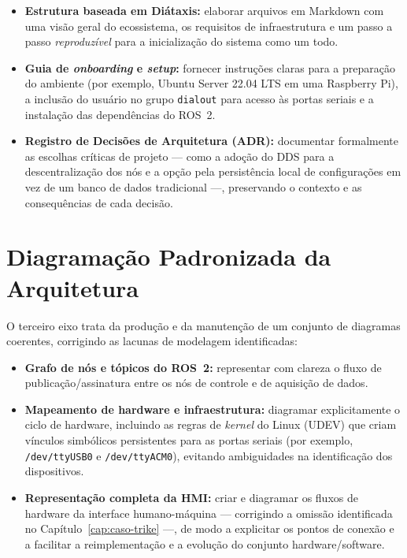 \begin{itemize}
	\item \textbf{Estrutura baseada em Diátaxis:} elaborar arquivos em Markdown com uma visão
	      geral do ecossistema, os requisitos de infraestrutura e um passo a passo
	      \emph{reproduzível} para a inicialização do sistema como um todo.
	\item \textbf{Guia de \emph{onboarding} e \emph{setup}:} fornecer instruções claras para a
	      preparação do ambiente (por exemplo, Ubuntu Server 22.04 LTS em uma Raspberry Pi), a
	      inclusão do usuário no grupo \texttt{dialout} para acesso às portas seriais e a
	      instalação das dependências do ROS~2.
	\item \textbf{Registro de Decisões de Arquitetura (ADR):} documentar formalmente as
	      escolhas críticas de projeto --- como a adoção do DDS para a descentralização dos
	      nós e a opção pela persistência local de configurações em vez de um banco de dados
	      tradicional ---, preservando o contexto e as consequências de cada decisão.
\end{itemize}

\section{Diagramação Padronizada da Arquitetura}
\label{sec:prop-diagramas}

O terceiro eixo trata da produção e da manutenção de um conjunto de diagramas coerentes,
corrigindo as lacunas de modelagem identificadas:

\begin{itemize}
	\item \textbf{Grafo de nós e tópicos do ROS~2:} representar com clareza o fluxo de
	      publicação/assinatura entre os nós de controle e de aquisição de dados.
	\item \textbf{Mapeamento de hardware e infraestrutura:} diagramar explicitamente o ciclo
	      de hardware, incluindo as regras de \emph{kernel} do Linux (UDEV) que criam
	      vínculos simbólicos persistentes para as portas seriais (por exemplo,
	      \texttt{/dev/ttyUSB0} e \texttt{/dev/ttyACM0}), evitando ambiguidades na
	      identificação dos dispositivos.
	\item \textbf{Representação completa da HMI:} criar e diagramar os fluxos de hardware da
	      interface humano-máquina --- corrigindo a omissão identificada no
	      Capítulo~\ref{cap:caso-trike} ---, de modo a explicitar os pontos de conexão e a
	      facilitar a reimplementação e a evolução do conjunto hardware/software.
\end{itemize}

